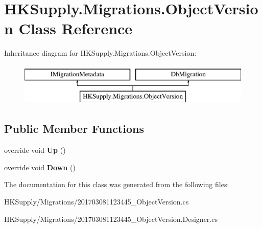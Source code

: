 \hypertarget{class_h_k_supply_1_1_migrations_1_1_object_version}{}\section{H\+K\+Supply.\+Migrations.\+Object\+Version Class Reference}
\label{class_h_k_supply_1_1_migrations_1_1_object_version}
Inheritance diagram for H\+K\+Supply.\+Migrations.\+Object\+Version\+:\begin{figure}[H]
\begin{center}
\leavevmode
\includegraphics[height=2.000000cm]{class_h_k_supply_1_1_migrations_1_1_object_version}
\end{center}
\end{figure}
\subsection*{Public Member Functions}
\begin{DoxyCompactItemize}
\item 
\mbox{\label{class_h_k_supply_1_1_migrations_1_1_object_version_a449ceb0bcf1543c45bc91b37a343210e}} 
override void {\bfseries Up} ()
\item 
\mbox{\label{class_h_k_supply_1_1_migrations_1_1_object_version_a08aaee0035439e6c97791a8e9c50a818}} 
override void {\bfseries Down} ()
\end{DoxyCompactItemize}


The documentation for this class was generated from the following files\+:\begin{DoxyCompactItemize}
\item 
H\+K\+Supply/\+Migrations/201703081123445\+\_\+\+Object\+Version.\+cs\item 
H\+K\+Supply/\+Migrations/201703081123445\+\_\+\+Object\+Version.\+Designer.\+cs\end{DoxyCompactItemize}
